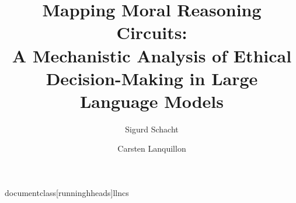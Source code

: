documentclass[runninghheads]{llncs}  


\usepackage[utf8]{inputenc}
\usepackage[T1]{fontenc}
\usepackage{graphicx}
\usepackage{amsmath}
\usepackage{float}
\usepackage{placeins}

\usepackage[framemethod=tikz]{mdframed} %
\usepackage{caption}                   %

\newenvironment{prompt}[1]{%
  \def\PromptCaption{#1}%
  \begin{figure}[ht]%
    \begin{mdframed}[
      linecolor=black,
      backgroundcolor=green!3,
      roundcorner=5pt,
      linewidth=1pt,
      innertopmargin=1em,
      innerbottommargin=1em
    ]%
}{%
    \end{mdframed}
    \caption{\PromptCaption}
  \end{figure}
}





\title{
Mapping Moral Reasoning Circuits: \\
A Mechanistic Analysis of Ethical Decision-Making in Large Language Models
}



\author{Sigurd Schacht %
\and
Carsten Lanquillon %
}

%
%
%



